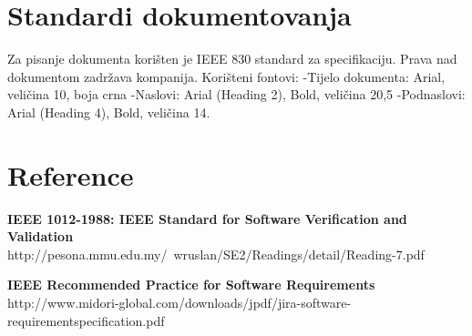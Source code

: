 \documentclass[]{report}
\begin{document}
\section{Standardi dokumentovanja}

Za pisanje dokumenta korišten je IEEE 830 standard za specifikaciju. Prava nad dokumentom zadržava kompanija. 
Korišteni fontovi: 
-Tijelo dokumenta: Arial, veličina 10, boja crna 
-Naslovi: Arial (Heading 2), Bold, veličina 20,5 
-Podnaslovi: Arial (Heading 4), Bold, veličina 14.

\section{Reference}

\begin{compactitem}
\item \textbf{IEEE 1012-1988: IEEE Standard for Software Verification and Validation}\\
http://pesona.mmu.edu.my/~wruslan/SE2/Readings/detail/Reading-7.pdf 
 
\item \textbf{IEEE Recommended Practice for Software Requirements}\\
http://www.midori-global.com/downloads/jpdf/jira-software-requirementspecification.pdf 

\end{compactitem}
 
\end{document}
